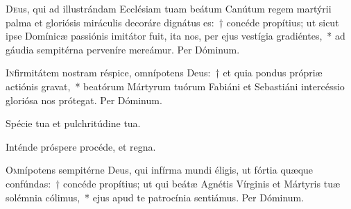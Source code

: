 \documentclass[vesperale_romanum.tex]{subfiles}
\begin{document}

\oratio

\lettrine{D}{e}us, qui ad illustrándam Ecclésiam tuam beátum Canútum regem martýrii palma et gloriósis miráculis decoráre dignátus es:~† concéde propítius; ut  sicut ipse Domínicæ passiónis imitátor fuit, ita nos, per ejus vestígia gradiéntes,~* ad gáudia sempitérna perveníre mereámur.
Per Dóminum.

\vespsequenti

\myrule


\duplexmajus

\oratio

\lettrine{I}{n}firmitátem nostram réspice, omnípotens Deus:~† et quia pondus própriæ actiónis gravat,~* beatórum Mártyrum tuórum Fabiáni et Sebastiáni intercéssio gloriósa nos prótegat.
Per Dóminum.

\capitdeseq

\myrule


\duplex








\vv Spécie tua et pulchritúdine tua. 

\rr Inténde próspere procéde, et regna.

\admagnificat

\oratio

\lettrine{O}{m}nípotens sempitérne Deus, qui infírma mundi éligis, ut fórtia quæque confúndas:~† concéde propítius; ut qui beátæ Agnétis Vírginis et Mártyris tuæ solémnia cólimus,~* ejus apud te patrocínia sentiámus. Per Dóminum.

\end{document}
